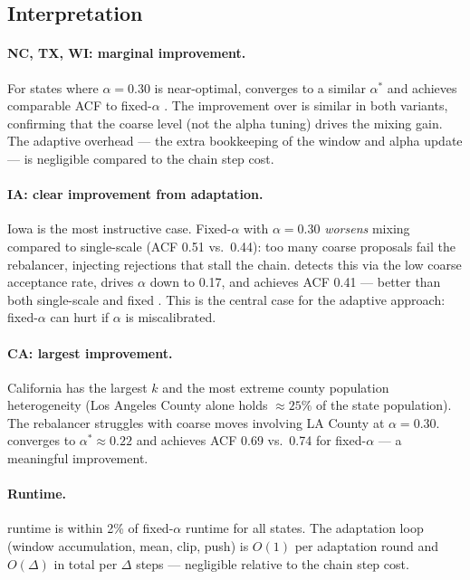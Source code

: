 \subsection{Interpretation}

\paragraph{NC, TX, WI: marginal improvement.}
For states where $\alpha = 0.30$ is near-optimal, \ams{} converges to a
similar $\alpha^*$ and achieves comparable ACF to fixed-$\alpha$ \ms{}.
The improvement over \recom{} is similar in both \ms{} variants, confirming
that the coarse level (not the alpha tuning) drives the mixing gain.
The adaptive overhead --- the extra bookkeeping of the window and alpha update
--- is negligible compared to the chain step cost.

\paragraph{IA: clear improvement from adaptation.}
Iowa is the most instructive case.
Fixed-$\alpha$ \ms{} with $\alpha = 0.30$ \emph{worsens} mixing compared to
single-scale \recom{} (ACF 0.51 vs.\ 0.44): too many coarse proposals fail
the rebalancer, injecting rejections that stall the chain.
\ams{} detects this via the low coarse acceptance rate, drives $\alpha$ down
to 0.17, and achieves ACF 0.41 --- better than both single-scale and fixed
\ms{}.
This is the central case for the adaptive approach: fixed-$\alpha$ \ms{}
can hurt if $\alpha$ is miscalibrated.

\paragraph{CA: largest improvement.}
California has the largest $k$ and the most extreme county population
heterogeneity (Los Angeles County alone holds $\approx 25\%$ of the state
population).
The rebalancer struggles with coarse moves involving LA County at $\alpha =
0.30$.
\ams{} converges to $\alpha^* \approx 0.22$ and achieves ACF 0.69 vs.\ 0.74
for fixed-$\alpha$ \ms{} --- a meaningful improvement.

\paragraph{Runtime.}
\ams{} runtime is within 2\% of fixed-$\alpha$ \ms{} runtime for all states.
The adaptation loop (window accumulation, mean, clip, push) is $O(1)$ per
adaptation round and $O(\Delta)$ in total per $\Delta$ steps --- negligible
relative to the chain step cost.

